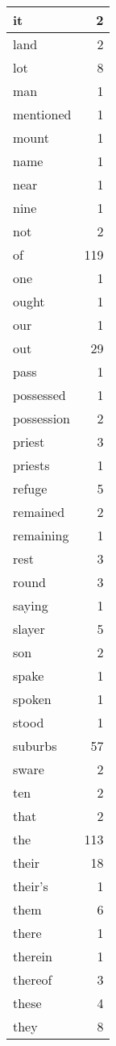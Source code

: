 \begin{center}
\begin{longtable}{l|r}
it & 2\\ \hline 
land & 2\\ \hline 
lot & 8\\ \hline 
man & 1\\ \hline 
mentioned & 1\\ \hline 
mount & 1\\ \hline 
name & 1\\ \hline 
near & 1\\ \hline 
nine & 1\\ \hline 
not & 2\\ \hline 
of & 119\\ \hline 
one & 1\\ \hline 
ought & 1\\ \hline 
our & 1\\ \hline 
out & 29\\ \hline 
pass & 1\\ \hline 
possessed & 1\\ \hline 
possession & 2\\ \hline 
priest & 3\\ \hline 
priests & 1\\ \hline 
refuge & 5\\ \hline 
remained & 2\\ \hline 
remaining & 1\\ \hline 
rest & 3\\ \hline 
round & 3\\ \hline 
saying & 1\\ \hline 
slayer & 5\\ \hline 
son & 2\\ \hline 
spake & 1\\ \hline 
spoken & 1\\ \hline 
stood & 1\\ \hline 
suburbs & 57\\ \hline 
sware & 2\\ \hline 
ten & 2\\ \hline 
that & 2\\ \hline 
the & 113\\ \hline 
their & 18\\ \hline 
their's & 1\\ \hline 
them & 6\\ \hline 
there & 1\\ \hline 
therein & 1\\ \hline 
thereof & 3\\ \hline 
these & 4\\ \hline 
they & 8\\ \hline 

\end{longtable}
\end{center}

